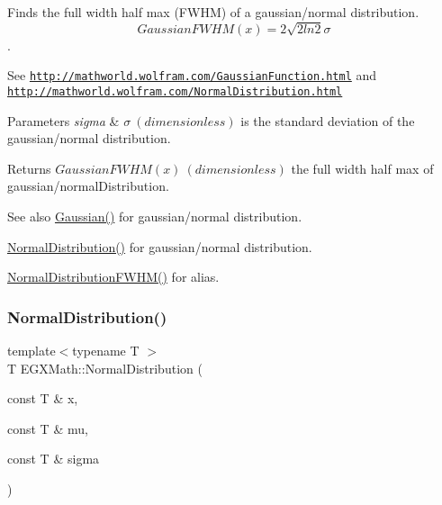 Finds the full width half max (F\+W\+HM) of a gaussian/normal distribution. \[GaussianFWHM(x)=2\sqrt{2 ln 2} \sigma \]. 

See \href{http://mathworld.wolfram.com/GaussianFunction.html}{\tt http\+://mathworld.\+wolfram.\+com/\+Gaussian\+Function.\+html} and \href{http://mathworld.wolfram.com/NormalDistribution.html}{\tt http\+://mathworld.\+wolfram.\+com/\+Normal\+Distribution.\+html} 
\begin{DoxyParams}{Parameters}
{\em sigma} & $\sigma\ (dimensionless)$ is the standard deviation of the gaussian/normal distribution. \\
\hline
\end{DoxyParams}
\begin{DoxyReturn}{Returns}
$GaussianFWHM(x)\ (dimensionless)$ the full width half max of gaussian/normal\+Distribution. 
\end{DoxyReturn}
\begin{DoxySeeAlso}{See also}
\mbox{\hyperlink{group___e_g_x_math-_functions-_gaussian_ga647b46315081e299edc16a1c7f4e4032}{Gaussian()}} for gaussian/normal distribution. 

\mbox{\hyperlink{group___e_g_x_math-_functions-_gaussian_ga3747a7d047293d0e5310ba112bece627}{Normal\+Distribution()}} for gaussian/normal distribution. 

\mbox{\hyperlink{group___e_g_x_math-_functions-_gaussian_gac537b8c525932979b28101cf432bcc0f}{Normal\+Distribution\+F\+W\+H\+M()}} for alias. 
\end{DoxySeeAlso}
\mbox{\label{group___e_g_x_math-_functions-_gaussian_ga3747a7d047293d0e5310ba112bece627}} 
\subsubsection{\texorpdfstring{Normal\+Distribution()}{NormalDistribution()}}
{\footnotesize\ttfamily template$<$typename T $>$ \\
T E\+G\+X\+Math\+::\+Normal\+Distribution (\begin{DoxyParamCaption}\item[{const T \&}]{x,  }\item[{const T \&}]{mu,  }\item[{const T \&}]{sigma }\end{DoxyParamCaption})}



